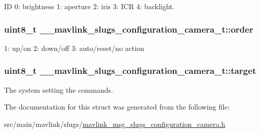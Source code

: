 I\+D 0\+: brightness 1\+: aperture 2\+: iris 3\+: I\+C\+R 4\+: backlight. 

\hypertarget{struct____mavlink__slugs__configuration__camera__t_ac5c553da1804f7c8cc704ed4c8a1ab4a}{
\subsubsection[{order}]{\setlength{\rightskip}{0pt plus 5cm}uint8\+\_\+t \+\_\+\+\_\+mavlink\+\_\+slugs\+\_\+configuration\+\_\+camera\+\_\+t\+::order}}\label{struct____mavlink__slugs__configuration__camera__t_ac5c553da1804f7c8cc704ed4c8a1ab4a}


1\+: up/on 2\+: down/off 3\+: auto/reset/no action 

\hypertarget{struct____mavlink__slugs__configuration__camera__t_a83b0e2edae59150e886e3e539c905817}{
\subsubsection[{target}]{\setlength{\rightskip}{0pt plus 5cm}uint8\+\_\+t \+\_\+\+\_\+mavlink\+\_\+slugs\+\_\+configuration\+\_\+camera\+\_\+t\+::target}}\label{struct____mavlink__slugs__configuration__camera__t_a83b0e2edae59150e886e3e539c905817}


The system setting the commands. 



The documentation for this struct was generated from the following file\+:\begin{DoxyCompactItemize}
\item 
src/main/mavlink/slugs/\hyperlink{mavlink__msg__slugs__configuration__camera_8h}{mavlink\+\_\+msg\+\_\+slugs\+\_\+configuration\+\_\+camera.\+h}\end{DoxyCompactItemize}
